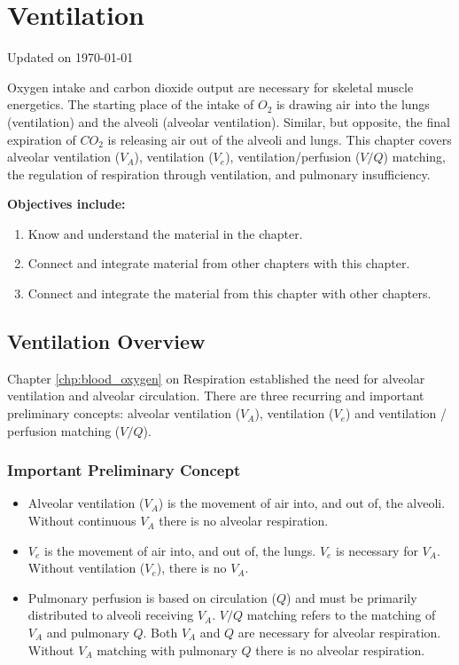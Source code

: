 \chapter{Ventilation}\label{chp:alveolar_oxygen}
Updated on \today
\minitoc

Oxygen intake and carbon dioxide output are necessary for skeletal muscle energetics. The starting place of the intake of $O_2$ is drawing air into the lungs (ventilation) and the alveoli (alveolar ventilation). Similar, but opposite, the final expiration of $CO_2$ is releasing air out of the alveoli and lungs. This chapter covers alveolar ventilation ($V_A$), ventilation ($V_e$), ventilation/perfusion ($V/Q$) matching, the regulation of respiration through ventilation, and pulmonary insufficiency.  

\vspace{5mm}

\textbf{Objectives include:}
\begin{enumerate}
    \item Know and understand the material in the chapter.
    \item Connect and integrate material from other chapters with this chapter.
    \item Connect and integrate the material from this chapter with other chapters.
\end{enumerate}

\section{Ventilation Overview}

Chapter \ref{chp:blood_oxygen} on Respiration established the need for alveolar ventilation and alveolar circulation. There are three recurring and important preliminary concepts: alveolar ventilation ($V_A$), ventilation ($V_e$) and ventilation / perfusion matching ($V/Q$).

\subsection{Important Preliminary Concept}

\begin{itemize}
    \item Alveolar ventilation ($V_A$) is the movement of air into, and out of, the alveoli. Without continuous $V_A$ there is no alveolar respiration. 
    \item $V_e$ is the movement of air into, and out of, the lungs. $V_e$ is necessary for $V_A$. Without ventilation ($V_e$), there is no $V_A$. 
    \item Pulmonary perfusion is based on circulation ($Q$) and must be primarily distributed to alveoli receiving $V_A$. $V/Q$ matching refers to the matching of $V_A$ and pulmonary $Q$. Both $V_A$ and $Q$ are necessary for alveolar respiration. Without $V_A$ matching with pulmonary $Q$ there is no alveolar respiration.
 \end{itemize}

